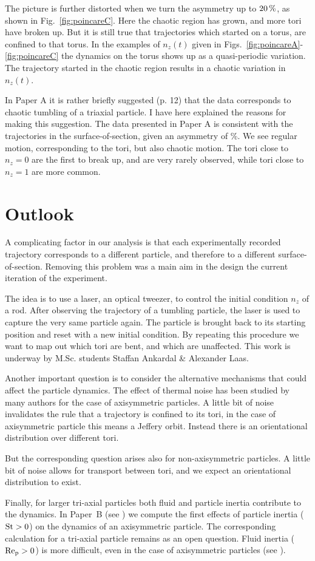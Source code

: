 \documentclass[thesis.tex]{subfiles}
\begin{document}
The picture is further distorted when we turn the asymmetry up to $\unit[20]{\%}$, as shown in Fig.~\ref{fig:poincareC}. Here the chaotic region has grown, and more tori have broken up. But it is still true that trajectories which started on a torus, are confined to that torus. In the examples of $n_z(t)$ given in Figs.~\ref{fig:poincareA}-\ref{fig:poincareC} the dynamics on the torus shows up as a quasi-periodic variation. The trajectory started in the chaotic region results in a chaotic variation in $n_z(t)$.

In Paper A it is rather briefly suggested (p. 12) that the data corresponds to chaotic tumbling of a triaxial particle. I have here explained the reasons for making this suggestion. The data presented in Paper A is consistent with the trajectories in the surface-of-section, given an asymmetry of \unit[10-30]{\%}. We see regular motion, corresponding to the tori, but also chaotic motion. The tori close to $n_z=0$ are the first to break up, and are very rarely observed, while tori close to $n_z=1$ are more common. 


\section{Outlook}

A complicating factor in our analysis is that each experimentally recorded trajectory corresponds to a different particle, and therefore to a different surface-of-section. Removing this problem was a main aim in the design the current iteration of the experiment.

The idea is to use a laser, an optical tweezer, to control the initial condition $n_z$ of a rod. After observing the trajectory of a tumbling particle, the laser is used to capture the very same particle again. The particle is brought back to its starting position and reset with a new initial condition. By repeating this procedure we want to map out which tori are bent, and which are unaffected. This work is underway by M.Sc. students Staffan Ankardal \& Alexander Laas.

Another important question is to consider the alternative mechanisms that could affect the particle dynamics. The effect of thermal noise has been studied by many authors for the case of axisymmetric particles. A little bit of noise invalidates the rule that a trajectory is confined to its tori, in the case of axisymmetric particle this means a Jeffery orbit. Instead there is an orientational distribution over different tori.

But the corresponding question arises also for non-axisymmetric particles. A little bit of noise allows for transport between tori, and we expect an orientational distribution to exist.

Finally, for larger tri-axial particles both fluid and particle inertia contribute to the dynamics. In Paper~B (see ) we compute the first effects of particle inertia ($\mbox{St}>0$) on the dynamics of an axisymmetric particle. The corresponding calculation for a tri-axial particle remains as an open question. Fluid inertia ($\mbox{Re}_{\mathrm p} > 0$) is more difficult, even in the case of axisymmetric particles (see ).
\end{document}
